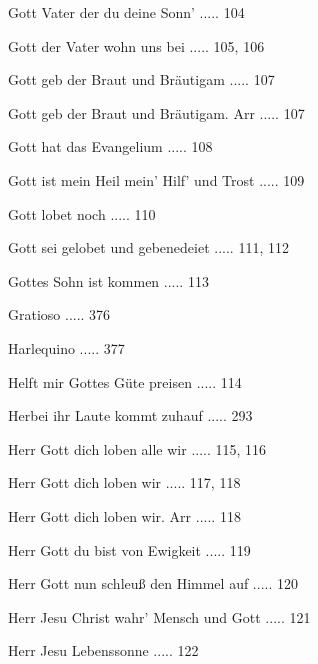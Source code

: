 \documentclass[twocolumn]{book}
\begin{document}
\newline 
Gott Vater der du deine Sonn' ..... 104

\newline 
Gott der Vater wohn uns bei ..... 105, 106

\newline 
Gott geb der Braut und Bräutigam ..... 107

\newline 
Gott geb der Braut und Bräutigam. Arr ..... 107

\newline 
Gott hat das Evangelium ..... 108

\newline 
Gott ist mein Heil mein' Hilf' und Trost ..... 109

\newline 
Gott lobet noch ..... 110

\newline 
Gott sei gelobet und gebenedeiet ..... 111, 112

\newline 
Gottes Sohn ist kommen ..... 113

\newline 
Gratioso ..... 376

\newline 
Harlequino ..... 377

\newline 
Helft mir Gottes Güte preisen ..... 114

\newline 
Herbei ihr Laute kommt zuhauf ..... 293

\newline 
Herr Gott dich loben alle wir ..... 115, 116

\newline 
Herr Gott dich loben wir ..... 117, 118

\newline 
Herr Gott dich loben wir. Arr ..... 118

\newline 
Herr Gott du bist von Ewigkeit ..... 119

\newline 
Herr Gott nun schleuß den Himmel auf ..... 120

\newline 
Herr Jesu Christ wahr' Mensch und Gott ..... 121

\newline 
Herr Jesu Lebenssonne ..... 122
\end{document}
